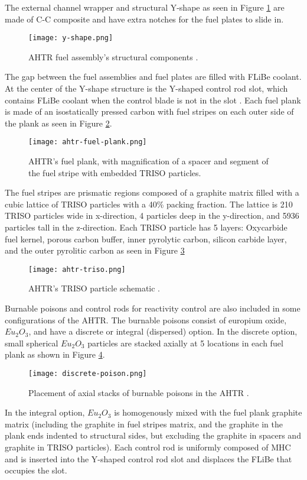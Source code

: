 The external channel wrapper and structural Y-shape as seen in Figure 
\ref{fig:y-shape} are made of C-C composite and have extra notches for the 
fuel plates to slide in. 
\begin{figure}[]
    \centering
    \texttt{[image: y-shape.png]} 
    \caption{\acrlong{AHTR} fuel assembly's structural components 
    \cite{noauthor_fluoride_nodate}.}
    \label{fig:y-shape}
\end{figure}
The gap between the fuel assemblies and fuel plates are filled with \gls{FLiBe}
coolant. 
At the center of the Y-shape structure is the Y-shaped control rod slot, 
which contains \gls{FLiBe} coolant when the control blade is not in the slot
\cite{varma_ahtr_2012,ramey_monte_2018,noauthor_fluoride_nodate}.
Each fuel plank is made of an isostatically pressed carbon with fuel stripes 
on each outer side of the plank as seen in Figure \ref{fig:ahtr-fuel-plank}. 
\begin{figure}[]
    \centering
    \texttt{[image: ahtr-fuel-plank.png]} 
    \caption{\acrlong{AHTR}'s fuel plank, with magnification of 
    a spacer and segment of the fuel stripe with embedded TRISO particles.}
    \label{fig:ahtr-fuel-plank}
\end{figure}
The fuel stripes are prismatic regions composed of a graphite matrix filled with 
a cubic lattice of \gls{TRISO} particles with a 40\% packing fraction. 
The lattice is 210 \gls{TRISO} particles wide in x-direction, 4 particles deep in 
the y-direction, and 5936 particles tall in the z-direction. 
Each \gls{TRISO} particle has 5 layers: Oxycarbide fuel kernel, porous carbon 
buffer, inner pyrolytic carbon, silicon carbide layer, and the outer pyrolitic 
carbon as seen in Figure \ref{fig:ahtr-triso}
\begin{figure}[]
    \centering
    \texttt{[image: ahtr-triso.png]} 
    \caption{\acrlong{AHTR}'s TRISO particle schematic \cite{noauthor_fluoride_nodate}.}
    \label{fig:ahtr-triso}
\end{figure}

Burnable poisons and control rods for reactivity control are also included in 
some configurations of the \gls{AHTR}. 
The burnable poisons consist of europium oxide, $Eu_2O_3$, and have a discrete
or integral (dispersed) option. 
In the discrete option, small spherical $Eu_2O_3$ particles are stacked axially 
at 5 locations in each fuel plank as shown in Figure \ref{fig:discrete-poison}. 
\begin{figure}[]
    \centering
    \texttt{[image: discrete-poison.png]} 
    \caption{Placement of axial stacks of burnable poisons in the \acrlong{AHTR} 
    \cite{noauthor_fluoride_nodate}.}
    \label{fig:discrete-poison}
\end{figure}
In the integral option, $Eu_2O_3$ is homogenously mixed with the fuel plank 
graphite matrix (including the graphite in fuel stripes matrix, and the 
graphite in the plank ends indented to structural sides, but excluding the 
graphite in spacers and graphite in TRISO particles). 
Each control rod is uniformly composed of \gls{MHC} and is inserted into the 
Y-shaped control rod slot and displaces the \gls{FLiBe} that occupies the slot. 

